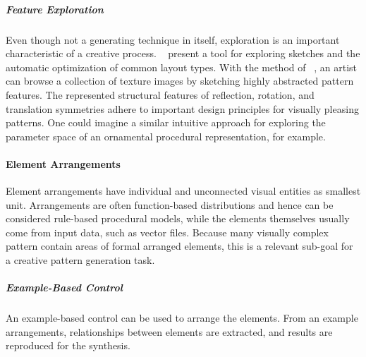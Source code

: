 \subparagraph{Feature Exploration}
\label{subpara:analysis_rulebased_sketchbased_feature_exploration}

Even though not a generating technique in itself, exploration is an important characteristic of a creative process. \citeauthor*{todi_2016_sse}~\cite{todi_2016_sse} present a tool for exploring sketches and the automatic optimization of common layout types. With the method of \citeauthor*{chen_2016_msi}~\cite{chen_2016_msi}, an artist can browse a collection of texture images by sketching highly abstracted pattern features. The represented structural features of reflection, rotation, and translation symmetries adhere to important design principles for visually pleasing patterns. One could imagine a similar intuitive approach for exploring the parameter space of an ornamental procedural representation, for example.





\paragraph{Element Arrangements}
\label{para:analysis_element_arrangements}

Element arrangements have individual and unconnected visual entities as smallest unit. Arrangements are often function-based distributions and hence can be considered rule-based procedural models, while the elements themselves usually come from input data, such as vector files. Because many visually complex pattern contain areas of formal arranged elements, this is a relevant sub-goal for a creative pattern generation task.


\subparagraph{Example-Based Control}
\label{subpara:analysis_element_arrangements_example}

An example-based control can be used to arrange the elements. From an example arrangements, relationships between elements are extracted, and results are reproduced for the synthesis. 


